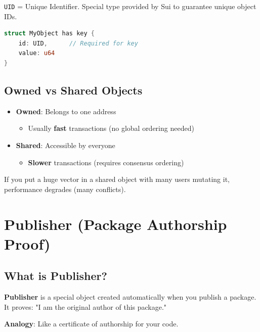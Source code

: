 \documentclass[11pt]{article}
\begin{document}
\texttt{UID} = Unique Identifier. Special type provided by Sui to guarantee unique object IDs.

\begin{lstlisting}[language=Rust]
struct MyObject has key {
    id: UID,      // Required for key
    value: u64
}
\end{lstlisting}

\subsection{Owned vs Shared Objects}

\begin{itemize}
  \item \textbf{Owned}: Belongs to one address
  \begin{itemize}
    \item Usually \textbf{fast} transactions (no global ordering needed)
  \end{itemize}
  
  \item \textbf{Shared}: Accessible by everyone
  \begin{itemize}
    \item \textbf{Slower} transactions (requires consensus ordering)
  \end{itemize}
\end{itemize}

\begin{warnBox}
If you put a huge vector in a shared object with many users mutating it, performance degrades (many conflicts).
\end{warnBox}

\section{Publisher (Package Authorship Proof)}

\subsection{What is Publisher?}

\textbf{Publisher} is a special object created automatically when you publish a package. It proves: "I am the original author of this package."

\begin{noteBox}
\textbf{Analogy}: Like a certificate of authorship for your code.
\end{noteBox}
\end{document}
